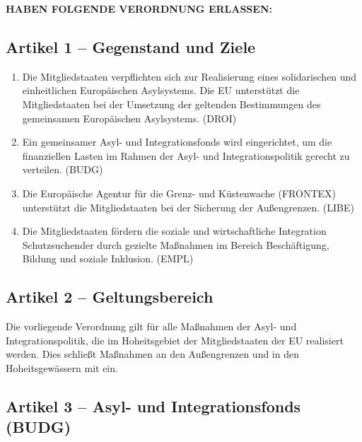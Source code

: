 \documentclass[12pt,a4paper]{article}
\begin{document}
\vspace{1cm}

\noindent\textbf{HABEN FOLGENDE VERORDNUNG ERLASSEN:}

\subsection*{Artikel 1 – Gegenstand und Ziele}

\begin{enumerate}[leftmargin=2em, itemsep=6pt]
  \item Die Mitgliedstaaten verpflichten sich zur Realisierung eines solidarischen und einheitlichen Europäischen Asylsystems. Die EU unterstützt die Mitgliedstaaten bei der Umsetzung der geltenden Bestimmungen des gemeinsamen Europäischen Asylsystems. (DROI)
  \item Ein gemeinsamer Asyl- und Integrationsfonds wird eingerichtet, um die finanziellen Lasten im Rahmen der Asyl- und Integrationspolitik gerecht zu verteilen. (BUDG)
  \item Die Europäische Agentur für die Grenz- und Küstenwache (FRONTEX) unterstützt die Mitgliedstaaten bei der Sicherung der Außengrenzen. (LIBE)
  \item Die Mitgliedstaaten fördern die soziale und wirtschaftliche Integration Schutzsuchender durch gezielte Maßnahmen im Bereich Beschäftigung, Bildung und soziale Inklusion. (EMPL)
\end{enumerate}

\subsection*{Artikel 2 – Geltungsbereich}

Die vorliegende Verordnung gilt für alle Maßnahmen der Asyl- und Integrationspolitik, die im Hoheitsgebiet der Mitgliedstaaten der EU realisiert werden. Dies schließt Maßnahmen an den Außengrenzen und in den Hoheitsgewässern mit ein.

\newpage

\subsection*{Artikel 3 – Asyl- und Integrationsfonds (BUDG)}
\end{document}
